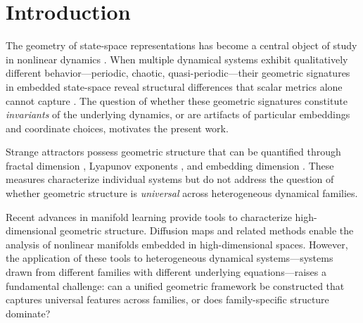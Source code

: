 \documentclass[aip,chaos,showpacs,superscriptaddress,groupedaddress]{revtex4-1}
\begin{document}
\maketitle

\section{Introduction}
\label{sec:intro}

The geometry of state-space representations has become a central object of study in nonlinear dynamics \cite{strogatz2015nonlinear, takens1981detecting, guckenheimer1983nonlinear}. When multiple dynamical systems exhibit qualitatively different behavior---periodic, chaotic, quasi-periodic---their geometric signatures in embedded state-space reveal structural differences that scalar metrics alone cannot capture \cite{packard1980geometry, fraser1986independent, crutchfield1986equivalence}. The question of whether these geometric signatures constitute \emph{invariants} of the underlying dynamics, or are artifacts of particular embeddings and coordinate choices, motivates the present work.

Strange attractors \cite{grassberger1983characterization, benedicks1991parameter} possess geometric structure that can be quantified through fractal dimension \cite{takens1984estimating, theiler1990estimating, albano1988singular}, Lyapunov exponents \cite{benettin1980lyapunov, wolff1985lyapunov, rosenstein1993practical, kantz1994robust}, and embedding dimension \cite{sauer1991embedding, broomhead1986extracting}. These measures characterize individual systems but do not address the question of whether geometric structure is \emph{universal} across heterogeneous dynamical families.

Recent advances in manifold learning \cite{tenenbaum2000global, roweis2000nonlinear, belkin2003laplacian, mcinnes2018umap} provide tools to characterize high-dimensional geometric structure. Diffusion maps \cite{coifman2005geometric} and related methods \cite{lee2007dimension, costa2007intrinsic, meng2019isomap} enable the analysis of nonlinear manifolds embedded in high-dimensional spaces. However, the application of these tools to heterogeneous dynamical systems---systems drawn from different families with different underlying equations---raises a fundamental challenge: can a unified geometric framework be constructed that captures universal features across families, or does family-specific structure dominate?
\end{document}
